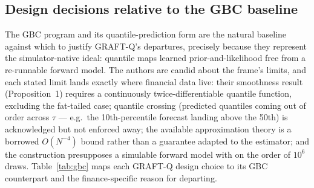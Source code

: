 \documentclass[11pt]{article}
\begin{document}
\subsection{Design decisions relative to the GBC baseline}\label{sec:gbc}
The GBC program \citep{polson2023gbc} and its quantile-prediction form \citep{nareklishvili2025gqbp} are the natural baseline against which to justify GRAFT-Q's departures, precisely because they represent the simulator-native ideal: quantile maps learned prior-and-likelihood free from a re-runnable forward model. The authors are candid about the frame's limits, and each stated limit lands exactly where financial data live: their smoothness result (Proposition~1) requires a continuously twice-differentiable quantile function, excluding the fat-tailed case; quantile crossing (predicted quantiles coming out of order across $\tau$ --- e.g.\ the 10th-percentile forecast landing above the 50th) is acknowledged but not enforced away; the available approximation theory is a borrowed $O(N^{-4})$ bound rather than a guarantee adapted to the estimator; and the construction presupposes a simulable forward model with on the order of $10^6$ draws. Table~\ref{tab:gbc} maps each GRAFT-Q design choice to its GBC counterpart and the finance-specific reason for departing.
\end{document}
